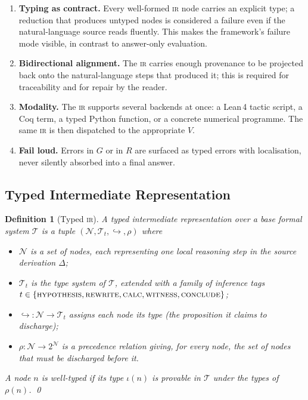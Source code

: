 \documentclass[11pt,a4paper]{article}
\newtheorem{definition}{Definition}
\newcommand{\IR}{\textsc{ir}}
\newcommand{\Coq}{Coq}
\newcommand{\LeanFour}{Lean\,4}
\begin{document}
\begin{enumerate}\itemsep4pt
\item \textbf{Typing as contract.}
Every well-formed \IR{} node carries an explicit type; a reduction
that produces untyped nodes is considered a failure even if the
natural-language source reads fluently.  This makes the framework's
failure mode visible, in contrast to answer-only evaluation.
\item \textbf{Bidirectional alignment.}
The \IR{} carries enough provenance to be projected back onto the
natural-language steps that produced it; this is required for
traceability and for repair by the reader.
\item \textbf{Modality.}
The \IR{} supports several backends at once: a \LeanFour{} tactic
script, a \Coq{} term, a typed Python function, or a concrete
numerical programme.  The same \IR{} is then dispatched to the
appropriate $V$.
\item \textbf{Fail loud.}
Errors in $G$ or in $R$ are surfaced as typed errors with
localisation, never silently absorbed into a final answer.
\end{enumerate}

\subsection{Typed Intermediate Representation}
\label{ssec:ir}

\begin{definition}[Typed \IR]
\label{def:ir}
A \emph{typed intermediate representation} over a base formal system
$\mathcal{T}$ is a tuple $(\mathcal{N}, \mathcal{T}_t,
\hookrightarrow, \rho)$ where
\begin{itemize}\itemsep2pt
\item $\mathcal{N}$ is a set of \emph{nodes}, each representing one
local reasoning step in the source derivation $\Delta$;
\item $\mathcal{T}_t$ is the type system of $\mathcal{T}$, extended
with a family of inference tags $t \in \{\textsc{hypothesis},
\textsc{rewrite}, \textsc{calc}, \textsc{witness},
\textsc{conclude}\}$;
\item $\hookrightarrow : \mathcal{N} \to \mathcal{T}_t$ assigns
each node its type (the proposition it claims to discharge);
\item $\rho : \mathcal{N} \to 2^\mathcal{N}$ is a precedence
relation giving, for every node, the set of nodes that must be
discharged before it.
\end{itemize}
A node $n$ is \emph{well-typed} if its type $\iota(n)$ is
provable in $\mathcal{T}$ under the types of $\rho(n)$.  \qed
\end{definition}
\end{document}
